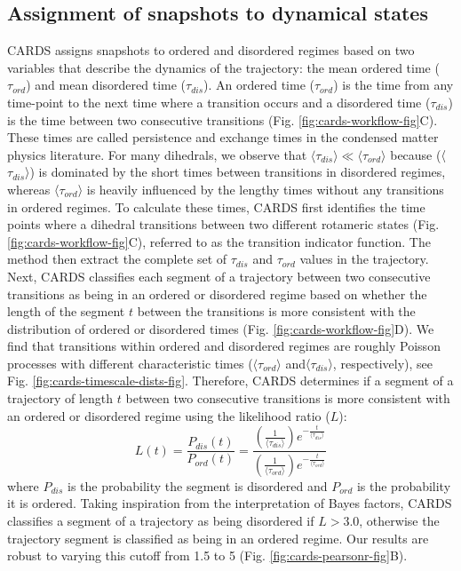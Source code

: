 \documentclass[../main.tex]{subfiles}
\begin{document}
    \subsection{Assignment of snapshots to dynamical states}
        CARDS assigns snapshots to ordered and disordered regimes based on two variables that describe the dynamics of the trajectory: the mean ordered time ($\tau_{ord}$) and mean disordered time ($\tau_{dis}$). An ordered time ($\tau_{ord}$) is the time from any time-point to the next time where a transition occurs and a disordered time ($\tau_{dis}$) is the time between two consecutive transitions (Fig. \ref{fig:cards-workflow-fig}C). These times are called persistence and exchange times in the condensed matter physics literature\cite{Hedges:2007fw,Keys:2011ut,Jung:2005jk}. For many dihedrals, we observe that $\langle\tau_{dis}\rangle \ll \langle\tau_{ord}\rangle$ because (〈$\tau_{dis}$〉) is dominated by the short times between transitions in disordered regimes, whereas 〈$\tau_{ord}$〉 is heavily influenced by the lengthy times without any transitions in ordered regimes. To calculate these times, CARDS first identifies the time points where a dihedral transitions between two different rotameric states (Fig. \ref{fig:cards-workflow-fig}C), referred to as the transition indicator function. The method then extract the complete set of $\tau_{dis}$ and $\tau_{ord}$ values in the trajectory. Next, CARDS classifies each segment of a trajectory between two consecutive transitions as being in an ordered or disordered regime based on whether the length of the segment $t$ between the transitions is more consistent with the distribution of ordered or disordered times (Fig. \ref{fig:cards-workflow-fig}D). We find that transitions within ordered and disordered regimes are roughly Poisson processes with different characteristic times ($\langle\tau_{ord}\rangle$ and〈$\tau_{dis}$〉, respectively), see Fig. \ref{fig:cards-timescale-dists-fig}. Therefore, CARDS determines if a segment of a trajectory of length $t$ between two consecutive transitions is more consistent with an ordered or disordered regime using the likelihood ratio ($L$):
        \begin{equation}\label{likelihood-ratio-eq}
        L(t)=\frac{P_{dis}(t)}{P_{ord}(t)}=\frac{(\frac{1}{\langle\tau_{dis}\rangle})e^{-\frac{t}{\langle\tau_{dis}\rangle}}}{(\frac{1}{\langle\tau_{ord}\rangle})e^{-\frac{t}{\langle\tau_{ord}\rangle}}}
        \end{equation}
        where $P_{dis}$ is the probability the segment is disordered and $P_{ord}$ is the probability it is ordered. Taking inspiration from the interpretation of Bayes factors\cite{Kass:2012bb}, CARDS classifies a segment of a trajectory as being disordered if $L>3.0$, otherwise the trajectory segment is classified as being in an ordered regime. Our results are robust to varying this cutoff from 1.5 to 5 (Fig. \ref{fig:cards-pearsonr-fig}B).
\end{document}
